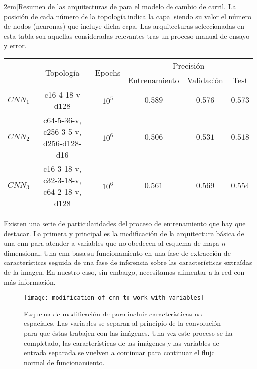\begin{table*}[t]
	\centering
	\caption[Resumen de las arquitecturas \acrshort{cnn} para el modelo de cambio de carril][2em]{Resumen de las arquitecturas de  para el modelo de cambio de carril. La posición de cada número de la topología indica la capa, siendo su valor el número de nodos (neuronas) que incluye dicha capa. Las arquitecturas seleccionadas en esta tabla son aquellas consideradas relevantes tras un proceso manual de ensayo y error.}
	\label{tbl:lc-cnn-architectures}
	\begin{tabular}{cccccc}
		\toprule
		\multirow{2}{*}{} & \multirow{2}{*}{Topología} & \multirow{2}{*}{Epochs} & \multicolumn{3}{c}{Precisión} \\
		& & & Entrenamiento & Validación & Test \\
		\midrule
		\rowcolor{black!20} $CNN_1$ & c16-4-18-v d128 & $10^5$ & $0.589$ & $0.576$ & $0.573$ \\
		$CNN_2$ & c64-5-36-v, c256-3-5-v, d256-d128-d16                       & $10^6$ & $0.506$ & $0.531$ & $0.518$ \\
		\rowcolor{black!20} $CNN_3$ & c16-3-18-v, c32-3-18-v, c64-2-18-v, d128 & $10^6$ & $0.561$ & $0.569$ & $0.554$ \\
		\bottomrule
	\end{tabular}
\end{table*}

Existen una serie de particularidades del proceso de entrenamiento que hay que destacar. La primera y principal es la modificación de la arquitectura básica de una \ac{cnn} para atender a variables que no obedecen al esquema de mapa $n$-dimensional. Una \ac{cnn} basa su funcionamiento en una fase de extracción de características seguida de una fase de inferencia sobre las características extraídas de la imagen. En nuestro caso, sin embargo, necesitamos alimentar a la red con más información.

\begin{figure}[b]
	\centering
	\texttt{[image: modification-of-cnn-to-work-with-variables]}
	\caption[Esquema de modificación de  para incluir características no espaciales]{Esquema de modificación de  para incluir características no espaciales. Las variables se separan al principio de la convolución para que éstas trabajen con las imágenes. Una vez este proceso se ha completado, las características de las imágenes y las variables de entrada separada se vuelven a continuar para continuar el flujo normal de funcionamiento.}
	\label{fig:modification-of-cnn-to-work-with-variables}
\end{figure}


